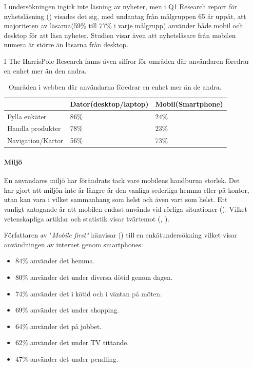 \documentclass[11pt]{article}
\begin{document}
I undersökningen ingick inte läsning av nyheter, men i Q1 Research report för nyhetsläsning (\cite{q1research}) visades det sig, med undantag från målgruppen 65 år uppåt, att majoriteten av läsarna(59\% till 77\% i varje målgrupp) använder både mobil och desktop för att läsa nyheter. Studien visar även att nyhetsläsare från mobilen numera är större än läsarna från desktop.

I The HarrisPole Research fanns även siffror för områden där användaren föredrar en enhet mer än den andra.

\begin{table}[H]
	\centering
	\begin{tabular}{|p{4cm}|p{4cm}|p{4cm}|}
	\hline
	~&Dator(desktop/laptop)&Mobil(Smartphone)\\ \hline
	Fylla enkäter &86\%&24\%\\ \hline
	Handla produkter&78\%&23\%\\ \hline
	Navigation/Kartor&56\%&73\%\\ \hline
	\end{tabular}
    \caption {Områden i webben där användarna föredrar en enhet mer än de andra.}
\end{table}

\paragraph{Miljö} \mbox{}

En användares miljö har förändrats tack vare mobilens handburna storlek. Det har gjort att miljön inte är längre är den vanliga sederliga hemma eller på kontor, utan kan vara i vilket sammanhang som helst och även vart som helst. Ett vanligt antagande är att mobilen endast används vid rörliga situationer (\cite[s.12]{mobilefirstluke}). Vilket vetenskapliga artiklar och statistik visar tvärtemot (\cite{mobilewebsearch}, \cite{mobilefirstluke}).

Författaren av "\textit{Mobile first"} hänvisar (\cite[s.12]{mobilefirstluke}) till en enkätundersökning vilket visar användningen av internet genom smartphones:
\begin{itemize}
	\item{84\% använder det hemma.}
	\item{80\% använder det under diversa dötid genom dagen.}
	\item{74\% använder det i kötid och i väntan på möten.}
	\item{69\% använder det under shopping.}
	\item{64\% använder det på jobbet.}
	\item{62\% använder det under TV tittande.}
	\item{47\% använder det under pendling.}
\end{itemize}
\bigskip
\end{document}
